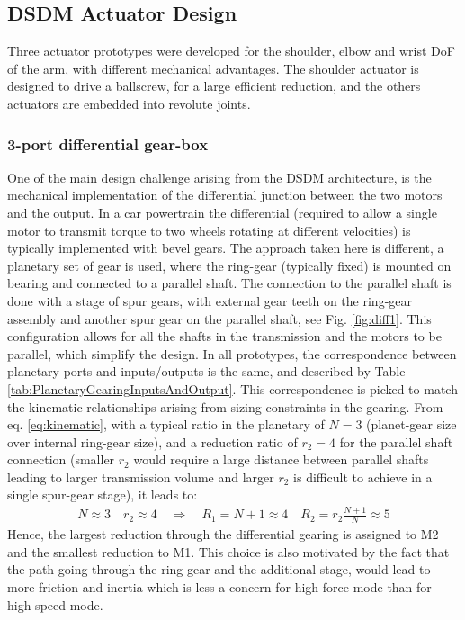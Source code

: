 \subsection{DSDM Actuator Design}
\label{sec:ActuatorDesign}
 
Three actuator prototypes were developed for the shoulder, elbow and wrist DoF of the arm, with different mechanical advantages. The shoulder actuator is designed to drive a ballscrew, for a large efficient reduction, and the others actuators are embedded into revolute joints. 

\subsubsection{3-port differential gear-box}

One of the main design challenge arising from the DSDM architecture, is the mechanical implementation of the differential junction between the two motors and the output. In a car powertrain the differential (required to allow a single motor to transmit torque to two wheels rotating at different velocities) is typically implemented with bevel gears. The approach taken here is different, a planetary set of gear is used, where the ring-gear (typically fixed) is mounted on bearing and connected to a parallel shaft. The connection to the parallel shaft is done with a stage of spur gears, with external gear teeth on the ring-gear assembly and another spur gear on the parallel shaft, see Fig. \ref{fig:diff1}. This configuration allows for all the shafts in the transmission and the motors to be parallel, which simplify the design. In all prototypes, the correspondence between planetary ports and inputs/outputs is the same, and described by Table \ref{tab:PlanetaryGearingInputsAndOutput}. This correspondence is picked to match the kinematic relationships arising from sizing constraints in the gearing. From eq. \eqref{eq:kinematic}, with a typical ratio in the planetary of $N=3$ (planet-gear size over internal ring-gear size), and a reduction ratio of $r_2=4$ for the parallel shaft connection (smaller $r_2$ would require a large distance between parallel shafts leading to larger transmission volume and larger $r_2$ is difficult to achieve in a single spur-gear stage), it leads to:
%
\begin{align}
	N \approx 3 \quad r_2 \approx 4 \quad\Rightarrow\quad R_1 = N+1 \approx 4 \quad R_2 = r_2 \frac{N+1}{N} \approx 5
\end{align}
%
Hence, the largest reduction through the differential gearing is assigned to M2 and the smallest reduction to M1. This choice is also motivated by the fact that the path going through the ring-gear and the additional stage, would lead to more friction and inertia which is less a concern for high-force mode than for high-speed mode. 

